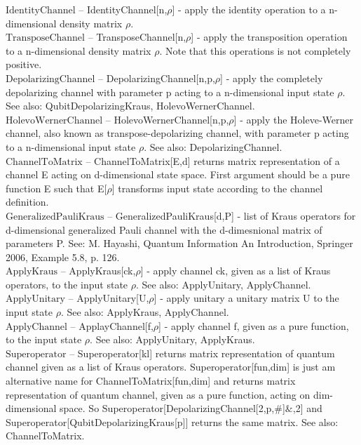 \noindent\textbf{$ \text{IdentityChannel} $ }-- IdentityChannel[n,$\rho $] - apply the identity operation to a n-dimensional density matrix $\rho $.$  $\\
\noindent\textbf{$ \text{TransposeChannel} $ }-- TransposeChannel[n,$\rho $] - apply the transposition operation to a n-dimensional density matrix $\rho $. Note that this operations is not completely positive.$  $\\
\noindent\textbf{$ \text{DepolarizingChannel} $ }-- DepolarizingChannel[n,p,$\rho $] - apply the completely depolarizing channel with parameter p acting to a n-dimensional input state $\rho $. See also: QubitDepolarizingKraus, HolevoWernerChannel.$  $\\
\noindent\textbf{$ \text{HolevoWernerChannel} $ }-- HolevoWernerChannel[n,p,$\rho $] - apply the Holeve-Werner channel, also known as transpose-depolarizing channel, with parameter p acting to a n-dimensional input state $\rho $. See also: DepolarizingChannel.$  $\\
\noindent\textbf{$ \text{ChannelToMatrix} $ }-- ChannelToMatrix[E,d] returns matrix representation of a channel E acting on d-dimensional state space. First argument should be a pure function E such that E[$\rho $] transforms input state according to the channel definition.$  $\\
\noindent\textbf{$ \text{GeneralizedPauliKraus} $ }-- GeneralizedPauliKraus[d,P] - list of Kraus operators for d-dimensional generalized Pauli channel with the d-dimesnional matrix of parameters P. See: M. Hayashi, Quantum Information An Introduction, Springer 2006, Example 5.8, p. 126.$  $\\
\noindent\textbf{$ \text{ApplyKraus} $ }-- ApplyKraus[ck,$\rho $] - apply channel ck, given as a list of Kraus operators, to the input state $\rho $. See also: ApplyUnitary, ApplyChannel.$  $\\
\noindent\textbf{$ \text{ApplyUnitary} $ }-- ApplyUnitary[U,$\rho $] - apply unitary a unitary matrix U to the input state $\rho $. See also: ApplyKraus, ApplyChannel.$  $\\
\noindent\textbf{$ \text{ApplyChannel} $ }-- ApplayChannel[f,$\rho $] - apply channel f, given as a pure function, to the input state $\rho $. See also: ApplyUnitary, ApplyKraus.$  $\\
\noindent\textbf{$ \text{Superoperator} $ }-- Superoperator[kl] returns matrix representation of quantum channel given as a list of Kraus operators. Superoperator[fun,dim] is just am alternative name for ChannelToMatrix[fun,dim] and returns matrix representation of quantum channel, given as a pure function, acting on dim-dimensional space. So Superoperator[DepolarizingChannel[2,p,$\#$]$\&$,2] and Superoperator[QubitDepolarizingKraus[p]] returns the same matrix. See also: ChannelToMatrix.$  $\\
